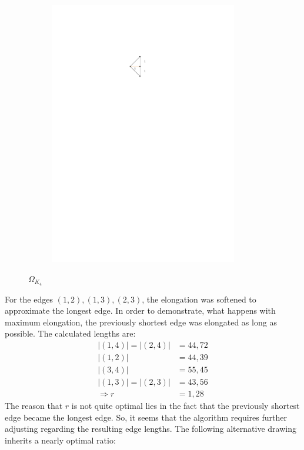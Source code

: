 	\begin{figure}[H]
	\centering
	\begin{subfigure}{0.6\linewidth}
		\centering
		\includegraphics[width=0.9\textwidth,page=14]{drawings/maximal_planar.pdf}
	\end{subfigure}
	\caption{$\Omega_{K_4}$}
\end{figure} 
For the edges $(1,2),(1,3),(2,3)$, the elongation was softened to approximate the longest edge. In order to demonstrate, what happens with maximum elongation, the previously shortest edge was elongated as long as possible. The calculated lengths are:
\begin{align}
	|(1,4)| = |(2,4)|&= 44,72\\
	|(1,2)| &= 44,39\\
	|(3,4)| &= 55,45\\
	|(1,3)| = |(2,3)| &= 43,56\\
	\Rightarrow r &= 1,28
\end{align}
The reason that $r$ is not quite optimal lies in the fact that the previously shortest edge became the longest edge. So, it seems that the algorithm requires further adjusting regarding the resulting edge lengths. The following alternative drawing inherits a nearly optimal ratio:

